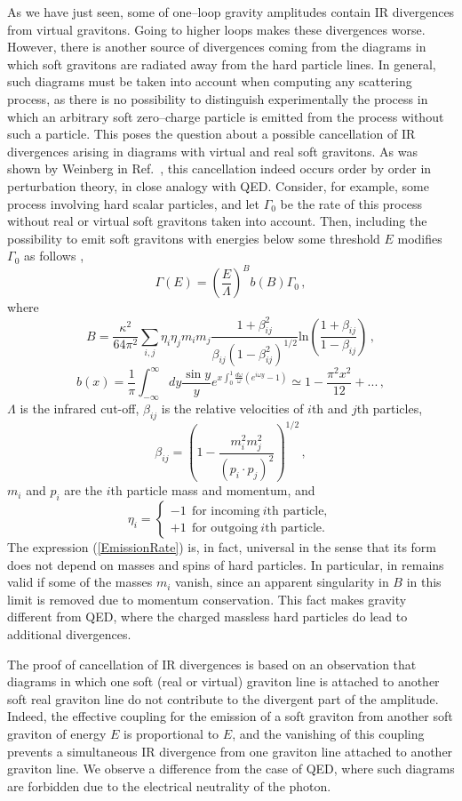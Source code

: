 \documentclass[12pt]{article}
\newcommand{\be}{\begin{equation}}
\newcommand{\ee}{\end{equation}}
\newcommand\G{\Gamma}
\renewcommand\b{\beta}
\begin{document}
As we have just seen, some of one--loop gravity amplitudes contain IR divergences from virtual gravitons. Going to higher loops makes these divergences worse. However, there is another source of divergences coming from the diagrams in which soft gravitons are radiated away from the hard particle lines. In general, such diagrams must be taken into account when computing any scattering process, as there is no possibility to distinguish experimentally the process in which an arbitrary soft zero--charge particle is emitted from the process without such a particle.
This poses the question about a possible cancellation of IR divergences arising in diagrams with virtual and real soft gravitons. As was shown by Weinberg in Ref.~\cite{Weinberg:1965nx}, this cancellation indeed occurs order by order in perturbation theory, in close analogy with QED. Consider, for example, some process involving hard scalar particles, and let
$\G_0$ be the rate of this process without real or virtual soft gravitons taken into account. Then, including the possibility to emit soft gravitons with energies below some threshold $E$ modifies $\G_0$ as follows \cite{Weinberg:1965nx},
\be\label{EmissionRate}
\G(E)=\left(\dfrac{E}{\Lambda}\right)^Bb(B)\G_0\,,
\ee
where
\be
B=\dfrac{\kappa^2}{64\pi^2}\sum_{i,j}\eta_i\eta_jm_im_j\dfrac{1+\b^2_{ij}}{\b_{ij}(1-\b_{ij}^2)^{1/2}}\text{ln}\left(\dfrac{1+\b_{ij}}{1-\b_{ij}}\right)\,,
\ee
\be
b(x)=\dfrac{1}{\pi}\int_{-\infty}^\infty dy\dfrac{\sin y}{y}e^{x\int_0^1\frac{d\omega}{\omega}(e^{i\omega y}-1)}\simeq 1-\dfrac{\pi^2x^2}{12}+...\,,
\ee
$\Lambda$ is the infrared cut-off, $\b_{ij}$ is the relative velocities of $i$th and $j$th particles,
\be
\b_{ij}=\left(1-\frac{m_i^2m_j^2}{(p_i\cdot p_j)^2}\right)^{1/2}\,,
\ee
$m_i$ and $p_i$ are the $i$th particle mass and momentum, and
\be\label{DefEta}
\eta_i=\left\lbrace\begin{array}{l}
-1~~\text{for incoming}~ i\text{th particle},\\
+1~~\text{for outgoing}~ i\text{th particle}.
\end{array}\right.
\ee
The expression (\ref{EmissionRate}) is, in fact, universal in the sense that its form does not depend on masses and spins of hard particles. In particular, in remains valid if some of the masses $m_i$ vanish, since an apparent singularity in $B$ in this limit is removed due to momentum conservation. This fact makes gravity different from QED, where the charged massless hard particles do lead to additional divergences.

The proof of cancellation of IR divergences is based on an observation that diagrams in which one soft (real or virtual) graviton line is attached to another soft real graviton line do not contribute to the divergent part of the amplitude. Indeed, the effective coupling for the emission of a soft graviton from another soft graviton of energy $E$ is proportional to $E$, and the vanishing of this coupling prevents a simultaneous IR divergence from one graviton line attached to another graviton line.
We observe a difference from the case of QED, where such diagrams are forbidden due to the electrical neutrality of the photon.
\end{document}
